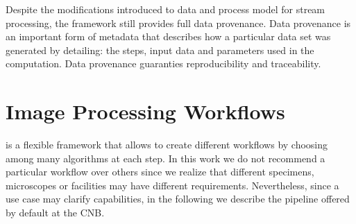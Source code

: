 Despite the modifications introduced to \scipion data and process model for stream processing, the framework still provides full data provenance. Data provenance is an important form of metadata that describes how a particular data set was generated by detailing: the steps, input data and parameters used in the computation. Data provenance guaranties reproducibility and traceability. %



\section{Image Processing Workflows}

\scipion is a flexible framework that allows to create different workflows by choosing among many algorithms at each step. In this work we do not recommend a particular workflow  over others since we realize that different specimens, microscopes or facilities may have different requirements. Nevertheless, since a use case may clarify \scipion capabilities, in the following we describe the pipeline offered by default 
at the CNB.

